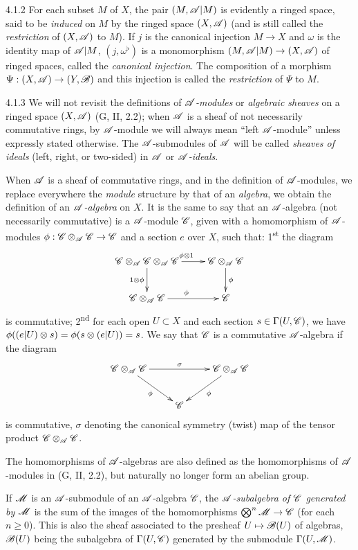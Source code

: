 \begin{env}{4.1.2}
\label{env-0.4.1.2}
For each subset $M$ of $X$, the pair $(M,\mathscr{A}|M)$ is evidently a ringed space,
said to be \emph{induced} on $M$ by the ringed space $(X,\mathscr{A})$ (and is still
called the \emph{restriction} of $(X,\mathscr{A})$ to $M$). If $j$ is the canonical
injection $M\to X$ and $\omega$ is the identity map of $\mathscr{A}|M$,
$(j,\omega^\flat)$ is a monomorphism $(M,\mathscr{A}|M)\to(X,\mathscr{A})$ of ringed
spaces, called the \emph{canonical injection}. The composition of a morphism
$\Psi:(X,\mathscr{A})\to(Y,\mathscr{B})$ and this injection is called the
\emph{restriction} of $\Psi$ to $M$.
\end{env}

\begin{env}{4.1.3}
\label{env-0.4.1.3}
We will not revisit the definitions of \emph{$\mathscr{A}$-modules} or
\emph{algebraic sheaves} on a ringed space $(X,\mathscr{A})$ (G, II, 2.2); when
$\mathscr{A}$ is a sheaf of not necessarily commutative rings, by $\mathscr{A}$-module we
will always mean ``left $\mathscr{A}$-module'' unless expressly stated otherwise. The
$\mathscr{A}$-submodules of $\mathscr{A}$ will be called \emph{sheaves of ideals} (left,
right, or two-sided) in $\mathscr{A}$ or \emph{$\mathscr{A}$-ideals}.

When $\mathscr{A}$ is a sheaf of commutative rings, and in the definition of
$\mathscr{A}$-modules, we replace everywhere the \emph{module} structure by that of
an \emph{algebra}, we obtain the definition of an \emph{$\mathscr{A}$-algebra} on
$X$. It is the same to say that an $\mathscr{A}$-algebra (not necessarily
commutative) is a $\mathscr{A}$-module $\mathscr{C}$, given with a homomorphism of
$\mathscr{A}$-modules $\phi:\mathscr{C}\otimes_\mathscr{A}\mathscr{C}\to\mathscr{C}$ and a section $e$
over $X$, such that: 1\textsuperscript{st} the diagram
\[
  \xymatrix{
    \sh{C}\otimes_\sh{A}\sh{C}\otimes_\sh{A}\sh{C}
    \ar[r]^{\vphi\otimes 1}\ar[d]_{1\otimes\vphi} &
    \sh{C}\otimes_\sh{A}\sh{C}\ar[d]^\vphi\\
    \sh{C}\otimes_\sh{A}\sh{C}\ar[r]^\vphi & \sh{C}
  }
\]
is commutative; 2\textsuperscript{nd} for each open $U\subset X$ and each
section $s\in\Gamma(U,\mathscr{C})$, we have
$\phi((e|U)\otimes s)=\phi(s\otimes(e|U))=s$. We say that $\mathscr{C}$ is a
commutative $\mathscr{A}$-algebra if the diagram
\[
  \xymatrix{
    \sh{C}\otimes_\sh{A}\sh{C}\ar[rr]^\sigma\ar[rd]_\vphi
    & & \sh{C}\otimes_\sh{A}\sh{C}\ar[ld]^\vphi\\
    & \sh{C}
  }
\]
is commutative, $\sigma$ denoting the canonical symmetry (twist) map of the
tensor product $\mathscr{C}\otimes_\mathscr{A}\mathscr{C}$.

The homomorphisms of $\mathscr{A}$-algebras are also defined as the homomorphisms of
$\mathscr{A}$-modules in (G, II, 2.2), but naturally no longer form an abelian group.

If $\mathscr{M}$ is an $\mathscr{A}$-submodule of an $\mathscr{A}$-algebra $\mathscr{C}$, the
\emph{$\mathscr{A}$-subalgebra of $\mathscr{C}$ generated by $\mathscr{M}$} is the sum of the
images of the homomorphisms $\bigotimes^n\mathscr{M}\to\mathscr{C}$ (for each
$n\geqslant 0$). This is also the sheaf associated to the presheaf
$U\mapsto\mathscr{B}(U)$ of algebras, $\mathscr{B}(U)$ being the subalgebra of
$\Gamma(U,\mathscr{C})$ generated by the submodule $\Gamma(U,\mathscr{M})$.
\end{env}

